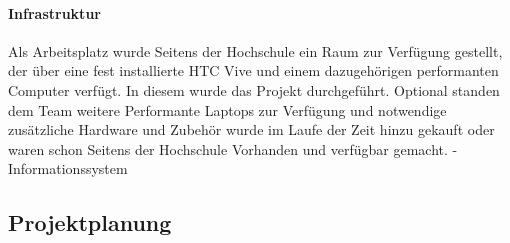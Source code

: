 \paragraph{Infrastruktur} Als Arbeitsplatz wurde Seitens der Hochschule ein Raum zur Verfügung gestellt, der über eine fest installierte HTC Vive und einem dazugehörigen performanten Computer verfügt. In diesem wurde das Projekt durchgeführt. Optional standen dem Team weitere Performante Laptops zur Verfügung und notwendige zusätzliche Hardware und Zubehör wurde im Laufe der Zeit hinzu gekauft oder waren schon Seitens der Hochschule Vorhanden und verfügbar gemacht.
- Informationssystem

\subsection{Projektplanung}

